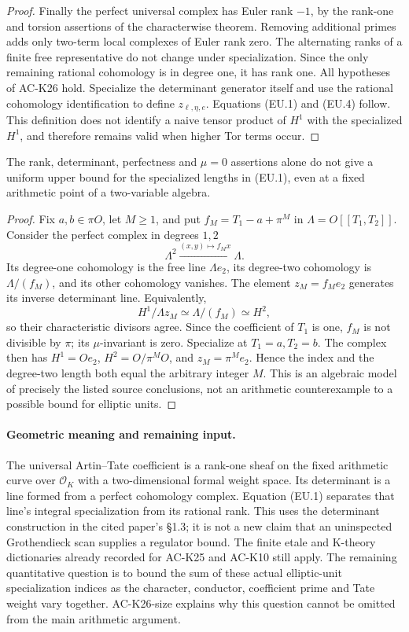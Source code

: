 \begin{proof}
Finally the perfect universal complex has Euler
rank $-1$, by the rank-one and torsion assertions of
the characterwise theorem.  Removing additional primes
adds only two-term local complexes of Euler rank zero.
The alternating ranks of a finite free representative
do not change under specialization.  Since the only
remaining rational cohomology is in degree one,
it has rank one.  All hypotheses of AC-K26 hold.
Specialize the determinant generator itself and use
the rational cohomology identification to define
$z_{\ell,\eta,e}$.  Equations (EU.1) and (EU.4) follow.
This definition does not identify a naive tensor
product of $H^1$ with the specialized $H^1$, and
therefore remains valid when higher Tor terms occur.
\end{proof}

\begin{proposition}
\label{AC-K26-size}
The rank, determinant, perfectness and $\mu=0$
assertions alone do not give a uniform upper bound
for the specialized lengths in (EU.1), even at a
fixed arithmetic point of a two-variable algebra.
\end{proposition}
\begin{proof}
Fix $a,b\in\pi O$, let $M\geq1$, and put
$f_M=T_1-a+\pi^M$ in $\Lambda=O[[T_1,T_2]]$.
Consider the perfect complex in degrees $1,2$
\[
 \Lambda^2\xrightarrow{(x,y)\mapsto f_Mx}\Lambda.
\]
Its degree-one cohomology is the free line
$\Lambda e_2$, its degree-two cohomology is
$\Lambda/(f_M)$, and its other cohomology vanishes.
The element $z_M=f_Me_2$ generates its inverse
determinant line.  Equivalently,
\[
 H^1/\Lambda z_M\simeq\Lambda/(f_M)\simeq H^2,
\]
so their characteristic divisors agree.
Since the coefficient of $T_1$ is one, $f_M$ is
not divisible by $\pi$; its $\mu$-invariant is zero.
Specialize at $T_1=a,T_2=b$.
The complex then has $H^1=Oe_2$, $H^2=O/\pi^MO$,
and $z_M=\pi^Me_2$.  Hence the index and the
degree-two length both equal the arbitrary integer $M$.
This is an algebraic model of precisely the listed
source conclusions, not an arithmetic counterexample
to a possible bound for elliptic units.
\end{proof}

\paragraph{Geometric meaning and remaining input.}
The universal Artin--Tate coefficient is a rank-one
sheaf on the fixed arithmetic curve over
$\mathcal O_K$ with a two-dimensional formal weight
space.  Its determinant is a line formed from a
perfect cohomology complex.  Equation (EU.1) separates
that line's integral specialization from its rational
rank.  This uses the determinant construction in the
cited paper's \S1.3; it is not a new claim that an
uninspected Grothendieck scan supplies a regulator bound.
The finite etale and K-theory dictionaries already
recorded for AC-K25 and AC-K10 still apply.
The remaining quantitative question is to bound the
sum of these actual elliptic-unit specialization
indices as the character, conductor, coefficient
prime and Tate weight vary together.  AC-K26-size
explains why this question cannot be omitted from
the main arithmetic argument.
